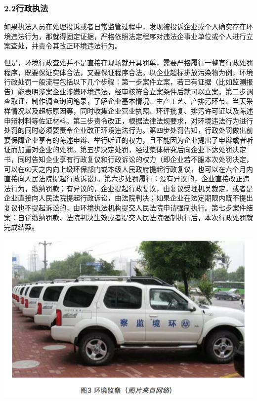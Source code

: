 \documentclass[]{book}
\begin{document}
\subsubsection{2.2行政执法}

如果执法人员在处理投诉或者日常监管过程中，发现被投诉企业或个人确实存在环境违法行为，那就得固定证据，严格依照法定程序对违法企事业单位或个人进行立案查处，并责令其改正环境违法行为。

但是，环境行政查处并不是直接在现场就开具罚单，需要严格履行一整套行政处罚程序，既要保证实体合法，又要保证程序合法。以企业超标排放污染物为例，环境行政处罚一般流程包括以下几个步骤：第一步案件立案，若已有证据（比如监测报告）能表明涉案企业涉嫌环境违法，经审核符合立案条件后就可以立案。第二步调查取证，制作调查询问笔录，了解企业基本情况、生产工艺、产排污环节、当天采样情况以及超标原因等，同时收集企业营业执照、环评批复、排污许可证以及陈述申辩材料等佐证材料。第三步责令改正，根据法律法规要求，对环境违法行为进行处罚的同时必须要责令企业改正环境违法行为。第四步处罚告知，行政处罚做出前要保障企业享有的陈述申辩、举行听证的权力，且不能因为企业提出了申辩或者听证而加重对企业的处罚。第五步决定处罚，经过集体研究后向企业下达处罚决定书，同时告知企业享有行政复议和行政诉讼的权力（即企业若不服本次处罚决定，可以在60天之内向上级环保部门或本级人民政府提起行政复议，也可以在六个月内直接向人民法院提起行政诉讼）。第六步处罚履行：没有异议的，企业直接改正违法行为，缴纳罚款；有异议的，企业提起行政复议，由复议受理机关裁定，或者是企业直接向人民法院提起行政诉讼，由法院判决；如果企业在法定期限内既不提出复议也不提起诉讼的，由环境执法机构提交人民法院申请强制执行。第七步案件结案：自觉缴纳罚款、法院判决生效或者提交人民法院强制执行后，本次行政处罚就完成结案。

\includegraphics[width=8.33in]{images/hjzf3}
\end{document}
